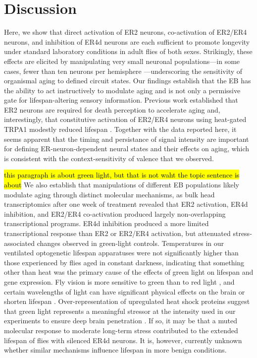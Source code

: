 \section*{Discussion}
Here, we show that direct activation of ER2 neurons, co-activation of ER2/ER4 neurons, and inhibition of ER4d neurons are each sufficient to promote longevity under standard laboratory conditions in adult flies of both sexes. 
Strikingly, these effects are elicited by manipulating very small neuronal populations---in some cases, fewer than ten neurons per hemisphere \citep{omoto2018}---underscoring the sensitivity of organismal aging to defined circuit states. 
Our findings establish that the EB has the ability to act instructively to modulate aging and is not only a permissive gate for lifespan-altering sensory information.
Previous work established that ER2 neurons are required for death perception to accelerate aging \citep{gendron2023} and, interestingly, that constitutive activation of ER2/ER4 neurons using heat-gated TRPA1 modestly reduced lifespan \citep{gendron2023}. 
Together with the data reported here, it seems apparent that the timing and persistance of signal intensity are important for defining ER-neuron-dependent neural states and their effects on aging, which is consistent with the context-sensitivity of valence that we observed.

\hl{this paragraph is about green light, but that is not waht the topic sentence is about}
We also establish that manipulations of different EB populations likely modulate aging through distinct molecular mechanisms, as bulk head transcriptomics after one week of treatment revealed that ER2 activation, ER4d inhibition, and ER2/ER4 co-activation produced largely non-overlapping transcriptional programs. 
ER4d inhibition produced a more limited transcriptional response than ER2 or ER2/ER4 activation, but attenuated stress-associated changes observed in green-light controls. 
Temperatures in our ventilated optogenetic lifespan apparatuses were not significantly higher than those experienced by flies aged in constant darkness, indicating that something other than heat was the primary cause of the effects of green light on lifespan and gene expression. 
Fly vision is more sensitive to green than to red light \citep{salcedo1999}, and certain wavelengths of light can have significant physical effects on the brain \citep{song2022} or shorten lifespan \citep{johnson2023}. Over-representation of upregulated heat shock proteins suggest that green light represents a meaningful stressor at the intensity used in our experiments to ensure deep brain penetration \citep{wolff2015}. 
If so, it may be that a muted molecular response to moderate long-term stress contributed to the extended lifespan of flies with silenced ER4d neurons. 
It is, however, currently unknown whether similar mechanisms influence lifespan in more benign conditions. 

